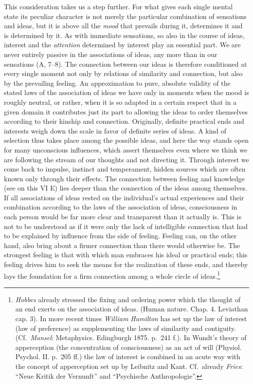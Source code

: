 \documentclass[12pt,a4paper]{book}
\newcommand{\opage}[1]{\marginnote{\footnotesize\textit{[#1]}}}
\begin{document}
This consideration takes us a step further. For what gives each single
mental state its peculiar character is not merely the particular
combination of sensations and ideas, but it is above all the
\emph{mood} that prevails during it, determines it and is determined by
it. As with immediate sensations, so also in the course of ideas,
interest and the \emph{attention} determined by interest play an
essential part. We are never entirely passive in the associations of
ideas, any more than in our sensations (A, 7--8). The connection between
our ideas is therefore conditioned at every single moment not only by
relations of similarity and connection, but also by the prevailing
feeling. An approximation to pure, absolute validity of the stated laws
of the association of ideas we have only in moments when the mood is
roughly neutral, or rather, when it is so adapted in a certain respect
that in a given domain it contributes just its part to allowing the
ideas to order themselves according to their kinship and connection.
Originally, definite practical ends and interests weigh down the scale
in favor of definite series of ideas. A kind of selection thus takes
place among the possible ideas, and here the way stands open for many
unconscious influences, which assert themselves even where we think we
are following the stream of our thoughts and not directing it. Through
interest we come back to impulse, instinct and temperament, hidden
sources which are often known only through their effects. The connection
between feeling and knowledge (see on this VI E) lies deeper than the
connection of the ideas among themselves. If all associations of ideas
rested on the individual's actual experiences and their combination
according to the laws of the association of ideas, consciousness in each
person would be far more clear and transparent than it actually is.
This is not to be understood as if it were only the lack of intelligible
connection that had
\opage{195}to be explained by influence from the side of feeling.
Feeling can, on the other hand, also bring about a firmer connection
than there would otherwise be. The strongest feeling is that with which
man embraces his ideal or practical ends; this feeling drives him to seek
the means for the realization of these ends, and thereby lays the
foundation for a firm connection among a whole circle of
ideas.\footnote{\emph{Hobbes} already stressed the fixing and ordering
power which the thought of an end exerts on the association of ideas.
(Human nature. Chap. 4. Leviathan cap. 3). In more recent times
\emph{William Hamilton} has set up the law of interest (law of
preference) as supplementing the laws of similarity and contiguity.
(Cf.\ \emph{Mansel}: Metaphysics. Edingburgh 1875. p.~241 f.). In
Wundt's theory of apperception (the concentration of consciousness) as
an act of will (Physiol. Psychol. II. p.~205 ff.) the law of interest is
combined in an acute way with the concept of apperception set up by
Leibnitz and Kant. Cf.\ already \emph{Fries}: ``Neue Kritik der
Vernunft'' and ``Psychische Anthropologie''.}
\end{document}
